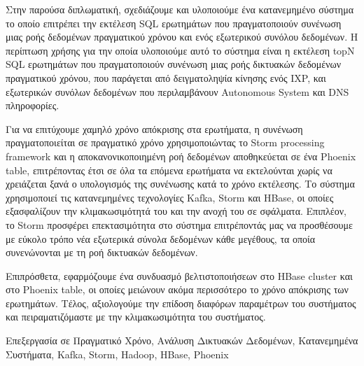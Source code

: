 \begin{abstractgr}

Στην παρούσα διπλωματική, σχεδιάζουμε και υλοποιούμε ένα κατανεμημένο σύστημα το οποίο επιτρέπει την εκτέλεση SQL ερωτημάτων που πραγματοποιούν συνένωση μιας ροής δεδομένων πραγματικού χρόνου και ενός εξωτερικού συνόλου δεδομένων. Η περίπτωση χρήσης για την οποία υλοποιούμε αυτό το σύστημα είναι η εκτέλεση topN SQL ερωτημάτων που πραγματοποιούν συνένωση μιας ροής δικτυακών δεδομένων πραγματικού χρόνου, που παράγεται από δειγματοληψία κίνησης ενός IXP, και εξωτερικών συνόλων δεδομένων που περιλαμβάνουν Autonomous System και DNS πληροφορίες.

Για να επιτύχουμε χαμηλό χρόνο απόκρισης στα ερωτήματα, η συνένωση πραγματοποιείται σε πραγματικό χρόνο χρησιμοποιώντας το Storm processing framework και η αποκανονικοποιημένη ροή δεδομένων αποθηκεύεται σε ένα Phoenix table, επιτρέποντας έτσι σε όλα τα επόμενα ερωτήματα να εκτελούνται χωρίς να χρειάζεται ξανά ο υπολογισμός της συνένωσης κατά το χρόνο εκτέλεσης. Το σύστημα χρησιμοποιεί τις κατανεμημένες τεχνολογίες Kafka, Storm και HBase, οι οποίες εξασφαλίζουν την κλιμακωσιμότητά του και την ανοχή του σε σφάλματα. Επιπλέον, το Storm προσφέρει επεκτασιμότητα στο σύστημα επιτρέποντάς μας να προσθέσουμε με εύκολο τρόπο νέα εξωτερικά σύνολα δεδομένων κάθε μεγέθους, τα οποία συνενώνονται με τη ροή δικτυακών δεδομένων.

Επιπρόσθετα, εφαρμόζουμε ένα συνδυασμό βελτιστοποιήσεων στο HBase cluster και στο Phoenix table, οι οποίες μειώνουν ακόμα περισσότερο το χρόνο απόκρισης των ερωτημάτων. Τέλος, αξιολογούμε την επίδοση διαφόρων παραμέτρων του συστήματος και πειραματιζόμαστε με την κλιμακωσιμότητα του συστήματος.

\begin{keywordsgr}
Επεξεργασία σε Πραγματικό Χρόνο, Ανάλυση Δικτυακών Δεδομένων, Κατανεμημένα Συστήματα, Kafka, Storm, Hadoop, HBase, Phoenix
\end{keywordsgr}
\end{abstractgr}
